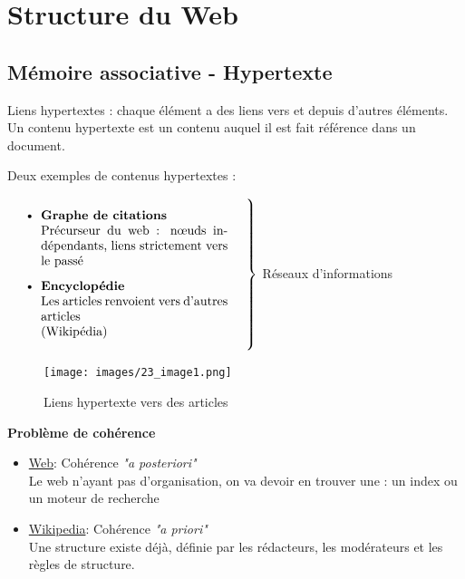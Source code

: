 \chapter{Structure du Web} %


\section{Mémoire associative - Hypertexte}

Liens hypertextes : chaque élément a des liens vers et depuis d'autres éléments. Un contenu hypertexte est un contenu auquel il est fait référence dans un document.

\vspace{0.5cm}
Deux exemples de contenus hypertextes :

$
\left. 
\parbox{0.5\linewidth}{
\begin{itemize}
\item \textbf{Graphe de citations} \\
		Précurseur du web : nœuds indépendants, liens strictement vers le passé
\item \textbf{Encyclopédie} \\
		Les articles renvoient vers d'autres articles \\ (Wikipédia)
\end{itemize}
}%
\hspace{0.5cm} \right\}
$ Réseaux d'informations




\begin{figure}[!h]
	\centering
	\texttt{[image: images/23\_image1.png]}
	\caption{Liens hypertexte vers des articles}
	\label{hypertexte}
\end{figure}

\textbf{Problème de cohérence}

\begin{itemize}
\item \underline{Web}: Cohérence \textit{"a posteriori"} 
						\vspace{0.1cm}
                       \\ Le web n'ayant pas d'organisation, on va devoir en trouver une : un index ou un moteur de recherche
                       \vspace{0.2cm}
      
\item \underline{Wikipedia}: Cohérence \textit{"a priori"}
							\vspace{0.1cm}
                             \\ Une structure existe déjà, définie par les rédacteurs, les modérateurs et les règles de structure.
\end{itemize}

